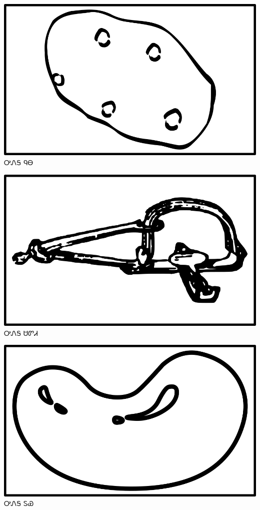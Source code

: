 \documentclass[avery5371]{flashcards}%
\begin{document}
\begin{flashcard}{
\includegraphics[width=0.95\columnwidth,height=.51\columnwidth,keepaspectratio]{../artwork/objects-neutral/nuna}
}\Huge ᎤᏁᎦ ᏄᎾ
\end{flashcard}

\begin{flashcard}{
\includegraphics[width=0.95\columnwidth,height=.51\columnwidth,keepaspectratio]{../artwork/objects-neutral/sadvdi}
}\Huge ᎤᏁᎦ ᏌᏛᏗ
\end{flashcard}

\begin{flashcard}{
\includegraphics[width=0.95\columnwidth,height=.51\columnwidth,keepaspectratio]{../artwork/objects-neutral/tuya}
}\Huge ᎤᏁᎦ ᏚᏯ
\end{flashcard}
\end{document}
